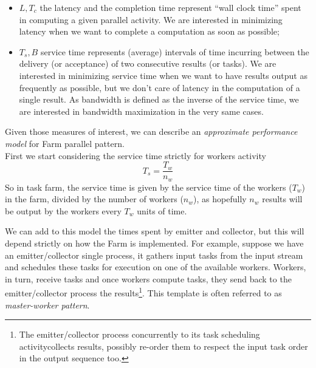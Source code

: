 	\begin{itemize}
		\item	\(L, T_c\) the latency and the completion time represent “wall clock time” spent in computing a given parallel activity. We are interested in minimizing latency when we want to complete a computation as soon as possible;
		\item \(T_s, B\) service time represents (average) intervals of time incurring between the delivery (or acceptance) of two consecutive results (or tasks). We are interested in minimizing service time when we want to have results output as frequently as possible, but we don't care of latency in the computation of a single result. As bandwidth is defined as the inverse of the service time, we are interested in bandwidth maximization in the very same cases\cite{spm}.
	\end{itemize}

	Given those measures of interest, we can describe an \textit{approximate performance model} for Farm parallel pattern.\\
	First we start considering the service time strictly for workers activity
	\begin{equation}
		T_s = \frac{T_w}{n_w}
	\end{equation}
	So in task farm, the service time is given by the service time of the workers (\(T_w\)) in the farm, divided by the number of workers (\(n_w\)), as hopefully \(n_w\) results will be output by the workers every \(T_w\) units of time\cite{spm}.
	
	We can add to this model the times spent by emitter and collector, but this will depend strictly on how the Farm is implemented. For example, suppose we have an emitter/collector single process, it gathers input tasks from the input stream and schedules these tasks for execution on one of the available workers. Workers, in turn, receive tasks and once workers compute tasks, they send back to the emitter/collector process the results\footnote{The emitter/collector process \textendash concurrently to its task scheduling	activity\textendash  collects results, possibly re-order them to respect the input task order in the output sequence too.}.
	This template is often referred to as \textit{master-worker pattern}.\\

